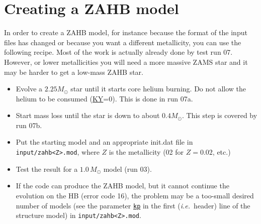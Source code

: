 \section{Creating a ZAHB model}

In order to create a ZAHB model, for instance because the format of the
input files has changed or because you want a different metallicity, you can
use the following recipe.  Most of the work is actually already done by test 
run 07.  However, or lower metallicities you will need a more massive ZAMS
star and it may be harder to get a low-mass ZAHB star.


\begin{itemize}
\item Evolve a $2.25 M_\odot$ star until it starts core helium burning.  Do not
  allow the helium to be consumed (\hyperlink{ky}{KY}=0).  This is done in run
  07a.
\item Start mass loss until the star is down to about $0.4 M_\odot$. This step
  is covered by run 07b.
\item Put the starting model and an appropriate init.dat file in
  \texttt{input/zahb<Z>.mod}, where $Z$ is the metallicity (02 for $Z=0.02$, etc.)
\item Test the result for a $1.0\,M_\odot$ model (run 03).
\item If the code can produce the ZAHB model, but it cannot
  continue the evolution on the HB (error code 16), the problem may be a too-small
  desired number of models (see the parameter \hyperlink{kp}{\texttt{kp}} in 
  the first (\emph{i.e.}\ header) line of the structure model) in 
  \texttt{input/zahb<Z>.mod}.
\end{itemize}

